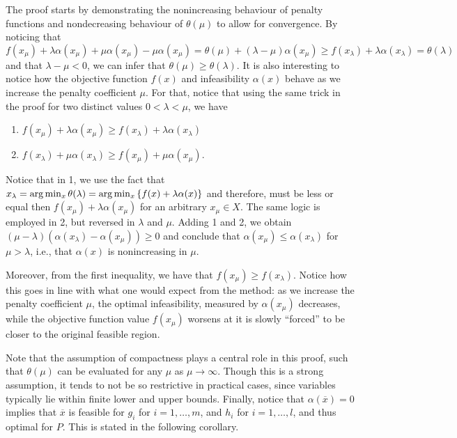 The proof starts by demonstrating the nonincreasing behaviour of penalty functions and nondecreasing behaviour of $\theta(\mu)$ to allow for convergence. By noticing that
$$ 
f(x_\mu) + \lambda\alpha(x_\mu) + \mu\alpha(x_\mu) - \mu\alpha(x_\mu)  = \theta(\mu) +(\lambda - \mu)\alpha(x_\mu) \geq f(x_\lambda) + \lambda \alpha(x_\lambda) = \theta(\lambda)
$$
and that $\lambda - \mu < 0$, we can infer that $\theta(\mu) \geq \theta(\lambda)$. It is also interesting to notice how the objective function $f(x)$ and infeasibility $\alpha(x)$ behave as we increase the penalty coefficient $\mu$. For that, notice that using the same trick in the proof for two distinct values $0 < \lambda < \mu$, we have

\begin{enumerate}
	\item $f(x_\mu) + \lambda\alpha(x_\mu) \geq f(x_\lambda) + \lambda \alpha(x_\lambda)$ 
	\item $f(x_\lambda) + \mu\alpha(x_\lambda) \geq f(x_\mu) + \mu \alpha(x_\mu)$.
\end{enumerate}

Notice that in 1, we use the fact that $x_\lambda = \arg\min_x \theta(\lambda) = \arg\min_x \left\{ f(x) + \lambda\alpha(x) \right \}$ and therefore, must be less or equal then $f(x_\mu) + \lambda\alpha(x_\mu)$ for an arbitrary $x_\mu \in X$. The same logic is employed in 2, but reversed in $\lambda$ and $\mu$. Adding 1 and 2, we obtain $(\mu - \lambda)(\alpha(x_\lambda) - \alpha(x_\mu)) \geq 0$ and conclude that $\alpha(x_\mu) \leq \alpha(x_\lambda)$ for $\mu > \lambda$, i.e., that $\alpha(x)$ is nonincreasing in $\mu$. 

Moreover, from the first inequality, we have that $f(x_\mu) \geq f(x_\lambda)$. Notice how this goes in line with what one would expect from the method: as we increase the penalty coefficient $\mu$, the optimal infeasibility, measured by $\alpha(x_\mu)$ decreases, while the objective function value $f(x_\mu)$ worsens at it is slowly ``forced'' to be closer to the original feasible region. 

Note that the assumption of compactness plays a central role in this proof, such that $\theta(\mu)$ can be evaluated for any $\mu$ as $\mu \rightarrow \infty$. Though this is a strong assumption, it tends to not be so restrictive in practical cases, since variables typically lie within finite lower and upper bounds. Finally, notice that $\alpha(\overline{x})= 0$ implies that $\overline{x}$ is feasible for $g_i$ for $i=1,\dots,m$, and $h_i$ for $i=1,\dots,l$, and thus optimal for $P$. This is stated in the following corollary.

